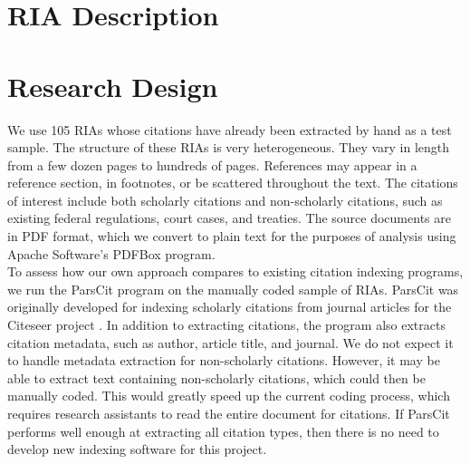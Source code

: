 \documentclass[12pt]{article}
\begin{document}
\section{RIA Description}

\section{Research Design}
We use 105 RIAs whose citations have already been extracted by hand as a test sample. The structure of these RIAs is very heterogeneous. They vary in length from a few dozen pages to hundreds of pages. References may appear in a reference section, in footnotes, or be scattered throughout the text. The citations of interest include both scholarly citations and non-scholarly citations, such as existing federal regulations, court cases, and treaties. The source documents are in PDF format, which we convert to plain text for the purposes of analysis using Apache Software's PDFBox program.\\ 

To assess how our own approach compares to existing citation indexing programs, we run the ParsCit program on the manually coded sample of RIAs. ParsCit was originally developed for indexing scholarly citations from journal articles for the Citeseer project \cite{councilletal2008}. In addition to extracting citations, the program also extracts citation metadata, such as author, article title, and journal. We do not expect it to handle metadata extraction for non-scholarly citations. However, it may be able to extract text containing non-scholarly citations, which could then be manually coded. This would greatly speed up the current coding process, which requires research assistants to read the entire document for citations. If ParsCit performs well enough at extracting all citation types, then there is no need to develop new indexing software for this project.\\
\end{document}
